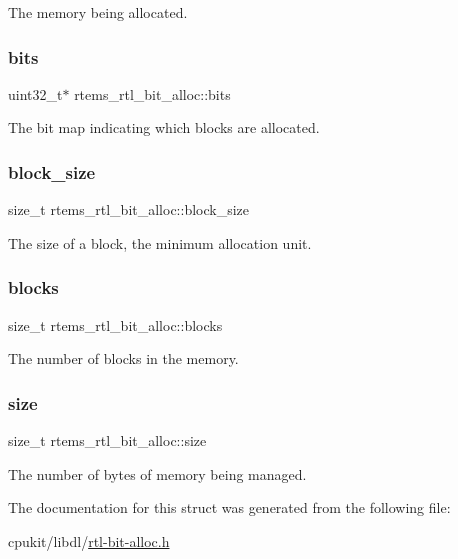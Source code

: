 The memory being allocated. \mbox{\label{structrtems__rtl__bit__alloc_a553723c705da84d0805ec11281171759}} 
\subsubsection{\texorpdfstring{bits}{bits}}
{\footnotesize\ttfamily uint32\+\_\+t$\ast$ rtems\+\_\+rtl\+\_\+bit\+\_\+alloc\+::bits}

The bit map indicating which blocks are allocated. \mbox{\label{structrtems__rtl__bit__alloc_a91a6949ffc363f15707bc32d99a439f1}} 
\subsubsection{\texorpdfstring{block\_size}{block\_size}}
{\footnotesize\ttfamily size\+\_\+t rtems\+\_\+rtl\+\_\+bit\+\_\+alloc\+::block\+\_\+size}

The size of a block, the minimum allocation unit. \mbox{\label{structrtems__rtl__bit__alloc_a95cebbedbf66f80d3a9862b9dc1a1a60}} 
\subsubsection{\texorpdfstring{blocks}{blocks}}
{\footnotesize\ttfamily size\+\_\+t rtems\+\_\+rtl\+\_\+bit\+\_\+alloc\+::blocks}

The number of blocks in the memory. \mbox{\label{structrtems__rtl__bit__alloc_af29cf9ce897a9b15378daf92444957e9}} 
\subsubsection{\texorpdfstring{size}{size}}
{\footnotesize\ttfamily size\+\_\+t rtems\+\_\+rtl\+\_\+bit\+\_\+alloc\+::size}

The number of bytes of memory being managed. 

The documentation for this struct was generated from the following file\+:\begin{DoxyCompactItemize}
\item 
cpukit/libdl/\mbox{\hyperlink{rtl-bit-alloc_8h}{rtl-\/bit-\/alloc.\+h}}\end{DoxyCompactItemize}
